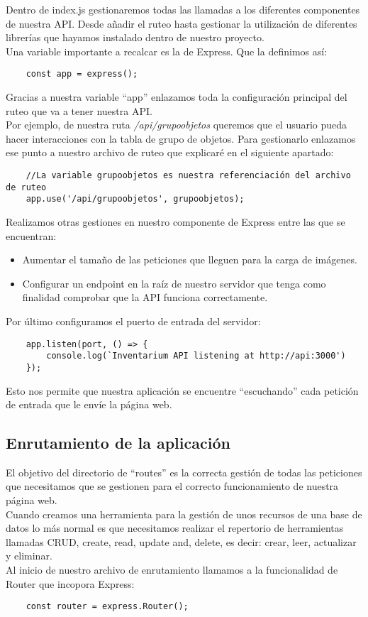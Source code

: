 Dentro de index.js gestionaremos todas las llamadas a los diferentes componentes de nuestra API. Desde añadir el ruteo hasta gestionar la utilización de diferentes librerías que hayamos instalado dentro de nuestro proyecto.
\\Una variable importante a recalcar es la de Express. Que la definimos así:
\begin{verbatim}
    const app = express();
\end{verbatim}
Gracias a nuestra variable ``app'' enlazamos toda la configuración principal del ruteo que va a tener nuestra API.
\\Por ejemplo, de nuestra ruta \textit{/api/grupoobjetos} queremos que el usuario pueda hacer interacciones con la tabla de grupo de objetos. Para gestionarlo enlazamos ese punto a nuestro archivo de ruteo que explicaré en el siguiente apartado:
\begin{verbatim}
    //La variable grupoobjetos es nuestra referenciación del archivo de ruteo
    app.use('/api/grupoobjetos', grupoobjetos); 
\end{verbatim}
Realizamos otras gestiones en nuestro componente de Express entre las que se encuentran:
\begin{itemize}
    \item Aumentar el tamaño de las peticiones que lleguen para la carga de imágenes.
    \item Configurar un endpoint en la raíz de nuestro servidor que tenga como finalidad comprobar que la API funciona correctamente.
\end{itemize}
Por último configuramos el puerto de entrada del servidor:
\begin{verbatim}
    app.listen(port, () => {
        console.log(`Inventarium API listening at http://api:3000')
    });
\end{verbatim}
Esto nos permite que nuestra aplicación se encuentre ``escuchando'' cada petición de entrada que le envíe la página web.

\subsection{Enrutamiento de la aplicación}
El objetivo del directorio de ``routes'' es la correcta gestión de todas las peticiones que necesitamos que se gestionen para el correcto funcionamiento de nuestra página web.
\\Cuando creamos una herramienta para la gestión de unos recursos de una base de datos lo más normal es que necesitamos realizar el repertorio de herramientas llamadas CRUD, create, read, update and, delete, es decir: crear, leer, actualizar y eliminar.
\\Al inicio de nuestro archivo de enrutamiento llamamos a la funcionalidad de Router que incopora Express:
\begin{verbatim}
    const router = express.Router();
\end{verbatim}

